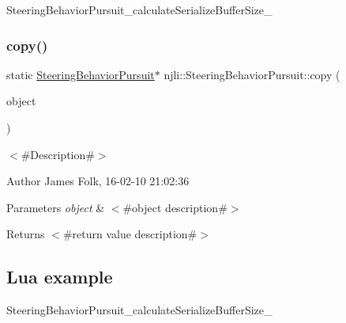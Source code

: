 \begin{DoxyCodeInclude}
\end{DoxyCodeInclude}
Steering\+Behavior\+Pursuit\+\_\+calculate\+Serialize\+Buffer\+Size\+\_\+ \mbox{\label{classnjli_1_1_steering_behavior_pursuit_a14a800efdbe7cbad41db3d56d0a1b22e}} 
\subsubsection{\texorpdfstring{copy()}{copy()}}
{\footnotesize\ttfamily static \mbox{\hyperlink{classnjli_1_1_steering_behavior_pursuit}{Steering\+Behavior\+Pursuit}}$\ast$ njli\+::\+Steering\+Behavior\+Pursuit\+::copy (\begin{DoxyParamCaption}\item[{const \mbox{\hyperlink{classnjli_1_1_steering_behavior_pursuit}{Steering\+Behavior\+Pursuit}} \&}]{object }\end{DoxyParamCaption})\hspace{0.3cm}{\ttfamily [static]}}



$<$\#\+Description\#$>$ 

\begin{DoxyAuthor}{Author}
James Folk, 16-\/02-\/10 21\+:02\+:36
\end{DoxyAuthor}

\begin{DoxyParams}{Parameters}
{\em object} & $<$\#object description\#$>$\\
\hline
\end{DoxyParams}
\begin{DoxyReturn}{Returns}
$<$\#return value description\#$>$
\end{DoxyReturn}
\hypertarget{classnjli_1_1_steering_behavior_wander_ex1}{}\subsection{Lua example}\label{classnjli_1_1_steering_behavior_wander_ex1}

\begin{DoxyCodeInclude}
\end{DoxyCodeInclude}
Steering\+Behavior\+Pursuit\+\_\+calculate\+Serialize\+Buffer\+Size\+\_\+ \mbox{\label{classnjli_1_1_steering_behavior_pursuit_a2503bd77be53a0648fd2e0d1f7c2f8c4}} 
